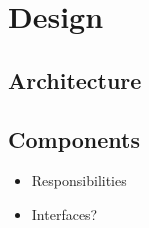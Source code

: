 \chapter{Design}

\section{Architecture}

\section{Components}

\begin{itemize}
	\item Responsibilities
	\item Interfaces?
\end{itemize}
